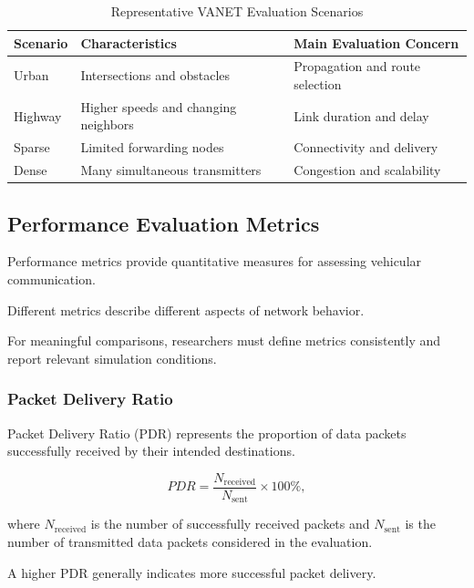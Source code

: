 \begin{table}[htbp]
\centering
\caption{Representative VANET Evaluation Scenarios}
\label{tab:vanet_scenarios}
\footnotesize
\begin{tabular}{|p{1.4cm}|p{2.3cm}|p{2.7cm}|}
\hline
\textbf{Scenario} &
\textbf{Characteristics} &
\textbf{Main Evaluation Concern} \\
\hline
Urban &
Intersections and obstacles &
Propagation and route selection \\
\hline
Highway &
Higher speeds and changing neighbors &
Link duration and delay \\
\hline
Sparse &
Limited forwarding nodes &
Connectivity and delivery \\
\hline
Dense &
Many simultaneous transmitters &
Congestion and scalability \\
\hline
\end{tabular}
\end{table}

\subsection{Performance Evaluation Metrics}
\label{sec:4D}

Performance metrics provide quantitative
measures for assessing vehicular
communication.

Different metrics describe different
aspects of network behavior.

For meaningful comparisons,
researchers must define metrics
consistently and report relevant
simulation conditions.

\subsubsection{Packet Delivery Ratio}

Packet Delivery Ratio (PDR) represents
the proportion of data packets
successfully received by their
intended destinations.

\begin{equation}
PDR =
\frac{N_{\mathrm{received}}}
{N_{\mathrm{sent}}}
\times 100\%,
\label{eq:pdr}
\end{equation}

where $N_{\mathrm{received}}$
is the number of successfully
received packets and
$N_{\mathrm{sent}}$ is the number
of transmitted data packets
considered in the evaluation.

A higher PDR generally indicates
more successful packet delivery.

